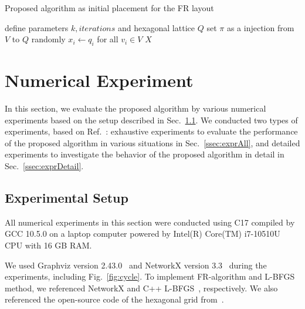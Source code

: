 \documentclass[dvipdfmx,journal]{IEEEtran}
\newcommand{\Cpp}{C\nolinebreak[4]\hspace{-.05em}\raisebox{.4ex}{\relsize{-3}{\textbf{++}}}}
\begin{document}
\begin{algorithm}[ht]
  \caption{Proposed algorithm as initial placement for the FR layout}
  \label{alg:proposed}

  define parameters $k, \textit{iterations}$ and hexagonal lattice $Q$\;
  set $\pi$ as a injection from $V$ to $Q$ randomly\;
  $x_i \gets q_i$ for all $v_i \in V$\;
  \Return $X$
\end{algorithm}

\section{Numerical Experiment} \label{sec:experiment}

In this section, we evaluate the proposed algorithm by various numerical experiments based on the setup described in Sec.~\ref{ssec:setup}.
We conducted two types of experiments, based on Ref.~\cite{8419285}: exhaustive experiments to evaluate the performance of the proposed algorithm in various situations in Sec.~\ref{ssec:exprAll}, and detailed experiments to investigate the behavior of the proposed algorithm in detail in Sec.~\ref{ssec:exprDetail}.

\subsection{Experimental Setup}\label{ssec:setup}

All numerical experiments in this section were conducted using \Cpp17 compiled by GCC 10.5.0 on a laptop computer powered by Intel(R) Core(TM) i7-10510U CPU with 16 GB RAM.

We used Graphviz version 2.43.0~\cite{ellsonGraphvizOpenSource2002} and NetworkX version 3.3~\cite{hagberg2008exploring} during the experiments, including Fig.~\ref{fig:cycle}.
To implement FR-algorithm and L-BFGS method, we referenced NetworkX and C++ L-BFGS~\cite{qiuYixuanLBFGSpp2024,okazakiChokkanLiblbfgs2024}, respectively.
We also referenced the open-source code of the hexagonal grid from~\cite{patelHexagonalGrids2013}.
\end{document}
